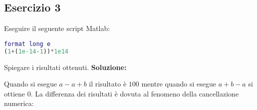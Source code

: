 \subsection{Esercizio 3}
Eseguire il seguente script Matlab:
\begin{lstlisting}[language=Matlab]
format long e
(1+(1e-14-1))*1e14
\end{lstlisting}
Spiegare i risultati ottenuti.
\newline \textbf{Soluzione:}

Quando si esegue $a-a+b$ il risultato è $100$ mentre quando si esegue $a+b-a$ si ottiene $0$. La differenza dei risultati è dovuta al fenomeno della cancellazione
numerica:

% 
